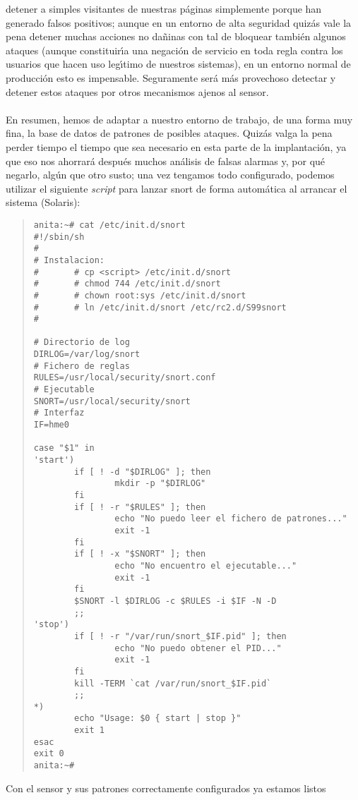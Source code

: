 detener a simples visitantes de nuestras p\'aginas simplemente porque han
generado falsos positivos; aunque en un entorno de alta seguridad quiz\'as
vale la pena detener muchas acciones no da\~ninas con tal de bloquear tambi\'en
algunos ataques (aunque constituir\'{\i}a una negaci\'on de servicio en toda 
regla contra los usuarios que hacen uso leg\'{\i}timo de nuestros sistemas), en 
un entorno normal de producci\'on esto es impensable. Seguramente ser\'a m\'as
provechoso detectar y detener estos ataques por otros mecanismos ajenos al
sensor.\\
\\En resumen, hemos de adaptar a nuestro entorno de trabajo, de una forma muy 
fina, la base de datos de patrones de posibles ataques. Quiz\'as valga la
pena perder tiempo el tiempo que sea necesario en esta parte de la 
implantaci\'on, ya que eso nos ahorrar\'a despu\'es muchos an\'alisis de
falsas alarmas y, por qu\'e negarlo, alg\'un que otro susto; una vez tengamos
todo configurado, podemos utilizar el siguiente {\it script} para lanzar {\sc
snort} de forma autom\'atica al arrancar el sistema (Solaris):
\begin{quote}
\begin{verbatim}
anita:~# cat /etc/init.d/snort
#!/sbin/sh
# 
# Instalacion:
#       # cp <script> /etc/init.d/snort
#       # chmod 744 /etc/init.d/snort
#       # chown root:sys /etc/init.d/snort
#       # ln /etc/init.d/snort /etc/rc2.d/S99snort
#

# Directorio de log
DIRLOG=/var/log/snort
# Fichero de reglas
RULES=/usr/local/security/snort.conf
# Ejecutable
SNORT=/usr/local/security/snort
# Interfaz
IF=hme0

case "$1" in
'start')
        if [ ! -d "$DIRLOG" ]; then
                mkdir -p "$DIRLOG"
        fi
        if [ ! -r "$RULES" ]; then
                echo "No puedo leer el fichero de patrones..."
                exit -1
        fi
        if [ ! -x "$SNORT" ]; then
                echo "No encuentro el ejecutable..."
                exit -1
        fi
        $SNORT -l $DIRLOG -c $RULES -i $IF -N -D
        ;;
'stop')
        if [ ! -r "/var/run/snort_$IF.pid" ]; then
                echo "No puedo obtener el PID..."
                exit -1
        fi
        kill -TERM `cat /var/run/snort_$IF.pid`
        ;;
*)
        echo "Usage: $0 { start | stop }"
        exit 1
esac
exit 0
anita:~# 
\end{verbatim}
\end{quote}
Con el sensor y sus patrones correctamente configurados ya estamos listos

